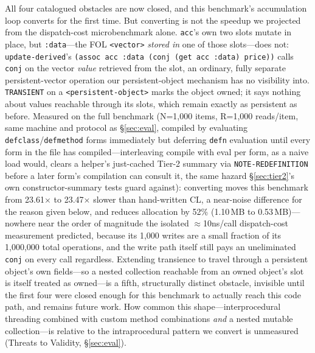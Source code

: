 \documentclass[sigplan,review,anonymous]{acmart}
\begin{document}
All four catalogued obstacles are now closed, and this benchmark's accumulation loop converts for the first time. But converting is not the speedup we projected from the dispatch-cost microbenchmark alone. \texttt{acc}'s own two slots mutate in place, but \texttt{:data}---the FOL \texttt{<vector>} \emph{stored in} one of those slots---does not: \texttt{update-derived}'s \texttt{(assoc acc :data (conj (get acc :data) price))} calls \texttt{conj} on the vector \emph{value} retrieved from the slot, an ordinary, fully separate persistent-vector operation our persistent-object mechanism has no visibility into. \texttt{TRANSIENT} on a \texttt{<persistent-object>} marks the object owned; it says nothing about values reachable through its slots, which remain exactly as persistent as before. Measured on the full benchmark (N=1{,}000 items, R=1{,}000 reads/item, same machine and protocol as §\ref{sec:eval}, compiled by evaluating \texttt{defclass}/\texttt{defmethod} forms immediately but deferring \texttt{defn} evaluation until every form in the file has compiled---interleaving compile with eval per form, as a naive load would, clears a helper's just-cached Tier-2 summary via \texttt{NOTE-REDEFINITION} before a later form's compilation can consult it, the same hazard \S\ref{sec:tier2}'s own constructor-summary tests guard against): converting moves this benchmark from 23.61$\times$ to 23.47$\times$ slower than hand-written CL, a near-noise difference for the reason given below, and reduces allocation by 52\% (1.10\,MB to 0.53\,MB)---nowhere near the order of magnitude the isolated $\approx$10ns/call dispatch-cost measurement predicted, because its 1{,}000 writes are a small fraction of its 1{,}000{,}000 total operations, and the write path itself still pays an uneliminated \texttt{conj} on every call regardless. Extending transience to travel through a persistent object's own fields---so a nested collection reachable from an owned object's slot is itself treated as owned---is a fifth, structurally distinct obstacle, invisible until the first four were closed enough for this benchmark to actually reach this code path, and remains future work. How common this shape---interprocedural threading combined with custom method combinations \emph{and} a nested mutable collection---is relative to the intraprocedural pattern we convert is unmeasured (Threats to Validity, §\ref{sec:eval}).
\end{document}
